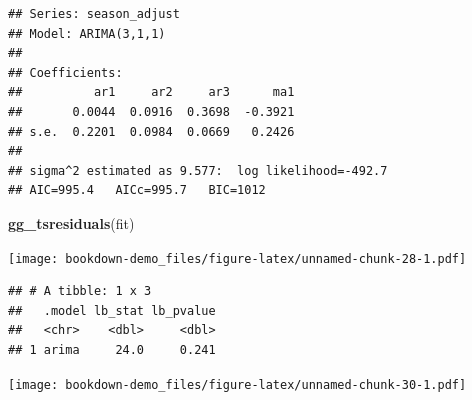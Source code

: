 \documentclass[]{book}
\newenvironment{Shaded}{\begin{snugshade}}{\end{snugshade}}
\newcommand{\DataTypeTok}[1]{\textcolor[rgb]{0.13,0.29,0.53}{#1}}
\newcommand{\DecValTok}[1]{\textcolor[rgb]{0.00,0.00,0.81}{#1}}
\newcommand{\KeywordTok}[1]{\textcolor[rgb]{0.13,0.29,0.53}{\textbf{#1}}}
\newcommand{\NormalTok}[1]{#1}
\newcommand{\OperatorTok}[1]{\textcolor[rgb]{0.81,0.36,0.00}{\textbf{#1}}}
\newcommand{\OtherTok}[1]{\textcolor[rgb]{0.56,0.35,0.01}{#1}}
\newcommand{\StringTok}[1]{\textcolor[rgb]{0.31,0.60,0.02}{#1}}
\begin{document}
\begin{Shaded}
\end{Shaded}

\begin{verbatim}
## Series: season_adjust 
## Model: ARIMA(3,1,1) 
## 
## Coefficients:
##          ar1     ar2     ar3      ma1
##       0.0044  0.0916  0.3698  -0.3921
## s.e.  0.2201  0.0984  0.0669   0.2426
## 
## sigma^2 estimated as 9.577:  log likelihood=-492.7
## AIC=995.4   AICc=995.7   BIC=1012
\end{verbatim}

\begin{Shaded}
\begin{Highlighting}[]
\KeywordTok{gg_tsresiduals}\NormalTok{(fit)}
\end{Highlighting}
\end{Shaded}

\texttt{[image: bookdown-demo\_files/figure-latex/unnamed-chunk-28-1.pdf]}

\begin{Shaded}
\end{Shaded}

\begin{verbatim}
## # A tibble: 1 x 3
##   .model lb_stat lb_pvalue
##   <chr>    <dbl>     <dbl>
## 1 arima     24.0     0.241
\end{verbatim}

\begin{Shaded}
\end{Shaded}

\texttt{[image: bookdown-demo\_files/figure-latex/unnamed-chunk-30-1.pdf]}
\end{document}
